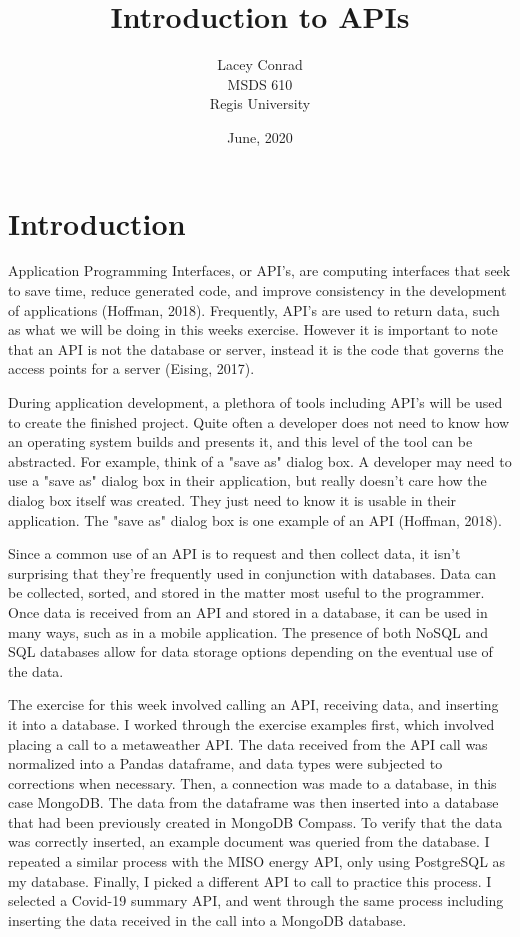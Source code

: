 \documentclass[]{article}
\title{Introduction to APIs}
\author{Lacey Conrad\\MSDS 610\\ Regis University}
\date{June, 2020}
\begin{document}
	\maketitle
	
\section{Introduction}
Application Programming Interfaces, or API's, are computing interfaces that seek to save time, reduce generated code, and improve consistency in the development of applications (Hoffman, 2018).  Frequently, API's are used to return data, such as what we will be doing in this weeks exercise.  However it is important to note that an API is not the database or server, instead it is the code that governs the access points for a server (Eising, 2017).  

During application development, a plethora of tools including API's will be used to create the finished project.  Quite often a developer does not need to know how an operating system builds and presents it, and this level of the tool can be abstracted.  For example, think of a "save as" dialog box.  A developer may need to use a "save as" dialog box in their application, but really doesn't care how the dialog box itself was created.  They just need to know it is usable in their application.  The "save as" dialog box is one example of an API (Hoffman, 2018).

Since a common use of an API is to request and then collect data, it isn't surprising that they're frequently used in conjunction with databases.  Data can be collected, sorted, and stored in the matter most useful to the programmer.  Once data is received from an API and stored in a database, it can be used in many ways, such as in a mobile application. The presence of both NoSQL and SQL databases allow for data storage options depending on the eventual use of the data. 

The exercise for this week involved calling an API, receiving data, and inserting it into a database.  I worked through the exercise examples first, which involved placing a call to a metaweather API.  The data received from the API call was normalized into a Pandas dataframe, and data types were subjected to corrections when necessary.  Then, a connection was made to a database, in this case MongoDB.  The data from the dataframe was then inserted into a database that had been previously created in MongoDB Compass.  To verify that the data was correctly inserted, an example document was queried from the database.  I repeated a similar process with the MISO energy API, only using PostgreSQL as my database.  Finally, I picked a different API to call to practice this process.  I selected a Covid-19 summary API, and went through the same process including inserting the data received in the call into a MongoDB database.
\end{document}
